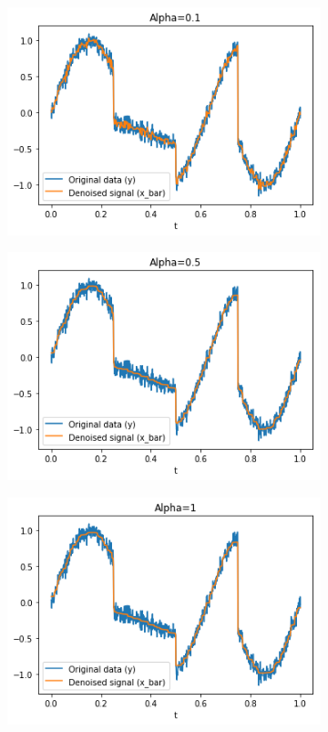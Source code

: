 \documentclass[ngerman, a4paper,12pt]{article}
\begin{document}
\begin{figure}[h]
	\centering
	\begin{subfigure}[b]{0.45\textwidth}
		\includegraphics[width=1\columnwidth]{Images/3a01.png}
		\label{3a01}
	\end{subfigure}
	\begin{subfigure}[b]{0.45\textwidth}
		\includegraphics[width=1\columnwidth]{Images/3a05.png}
		\label{3a05}
	\end{subfigure}
	\begin{subfigure}[b]{0.45\textwidth}
		\includegraphics[width=1\columnwidth]{Images/3a1.png}

\end{subfigure}
\end{figure}
\end{document}
